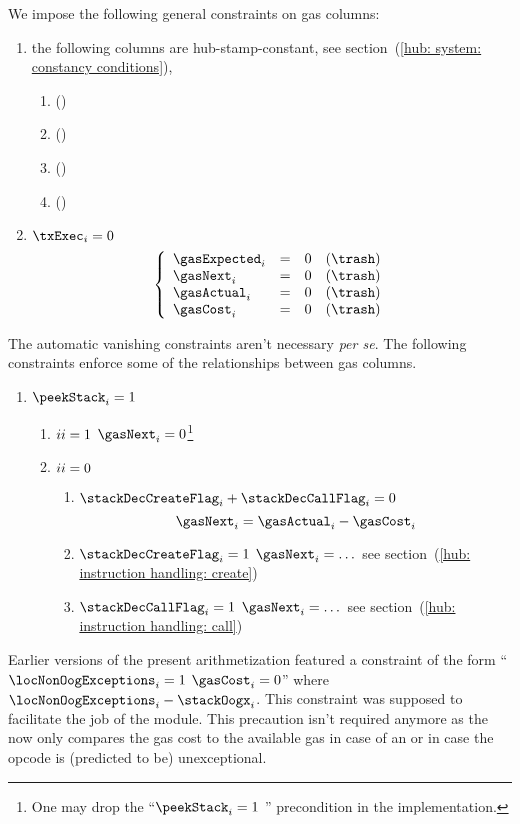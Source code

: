 We impose the following general constraints on gas columns:
\begin{enumerate}
	\item the following columns are hub-stamp-constant, see section~(\ref{hub: system: constancy conditions}),
		\begin{multicols}{2}
			\begin{enumerate}
				\item \gasExpected{} \quad (\sanityCheck)
				\item \gasNext{}     \quad (\sanityCheck)
				\item \gasActual{}   \quad (\sanityCheck)
				\item \gasCost{}     \quad (\sanityCheck)
			\end{enumerate}
		\end{multicols}
	\item \If $\txExec _{i} = 0$ \Then
		\[
			\left\{ \begin{array}{lclr}
				\gasExpected _{i} & = & 0 & (\trash) \\
				\gasNext     _{i} & = & 0 & (\trash) \\
				\gasActual   _{i} & = & 0 & (\trash) \\
				\gasCost     _{i} & = & 0 & (\trash) \\
			\end{array} \right.
		\]
\end{enumerate}
The automatic vanishing constraints aren't necessary \emph{per se}.
The following constraints enforce some of the relationships between gas columns.
\begin{enumerate}[resume]
	\item \If $\peekStack _{i} = 1$ \Then
		\begin{enumerate}
			\item \If $\xAhoy_{i} = 1$ \Then $\gasNext_{i} = 0$\footnote{One may drop the ``\If $\peekStack _{i} = 1$ \Then'' precondition in the implementation.}
			\item \If $\xAhoy_{i} = 0$ \Then
				\begin{enumerate}
					\item \If $\stackDecCreateFlag _{i} + \stackDecCallFlag _{i} = 0$ \Then
						\[ \gasNext_{i} = \gasActual_{i} - \gasCost_{i} \]
					\item \If $\stackDecCreateFlag _{i} = 1$ \Then $\gasNext_{i} = \dots$ see section~(\ref{hub: instruction handling: create})
					\item \If $\stackDecCallFlag   _{i} = 1$ \Then $\gasNext_{i} = \dots$ see section~(\ref{hub: instruction handling: call})
				\end{enumerate}
		\end{enumerate}
\end{enumerate}
\saNote{}
Earlier versions of the present arithmetization featured a constraint of the form
``\If $\locNonOogExceptions _{i} = 1$ \Then $\gasCost _{i} = 0$''
where $\locNonOogExceptions _{i} \def \xAhoy _{i} - \stackOogx_{i}$.
This constraint was supposed to facilitate the job of the \gasMod{} module.
This precaution isn't required anymore as the \gasMod{} now only compares the gas cost to the available gas in case of an \oogxSH{} or in case the opcode is (predicted to be) unexceptional.

